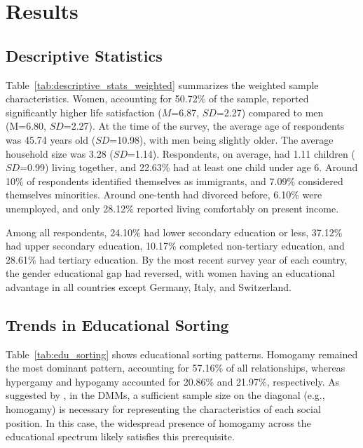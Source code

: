 \section{Results}
\label{sec:ch3-results}

\subsection{Descriptive Statistics}

Table~\ref{tab:descriptive_stats_weighted} summarizes the weighted sample characteristics. Women, accounting for 50.72\% of the sample, reported significantly higher life satisfaction ($M$=6.87, $SD$=2.27) compared to men (M=6.80, $SD$=2.27). At the time of the survey, the average age of respondents was 45.74 years old ($SD$=10.98), with men being slightly older. The average household size was 3.28 ($SD$=1.14). Respondents, on average, had 1.11 children ($SD$=0.99) living together, and 22.63\% had at least one child under age 6. Around 10\% of respondents identified themselves as immigrants, and 7.09\% considered themselves minorities. Around one-tenth had divorced before, 6.10\% were unemployed, and only 28.12\% reported living comfortably on present income.

Among all respondents, 24.10\% had lower secondary education or less, 37.12\% had upper secondary education, 10.17\% completed non-tertiary education, and 28.61\% had tertiary education. By the most recent survey year of each country, the gender educational gap had reversed, with women having an educational advantage in all countries except Germany, Italy, and Switzerland.

\subsection{Trends in Educational Sorting}

Table~\ref{tab:edu_sorting} shows educational sorting patterns. Homogamy remained the most dominant pattern, accounting for 57.16\% of all relationships, whereas hypergamy and hypogamy accounted for 20.86\% and 21.97\%, respectively. As suggested by \textcite{sobelSocialMobilityFertility1985}, in the DMMs, a sufficient sample size on the diagonal (e.g., homogamy) is necessary for representing the characteristics of each social position. In this case, the widespread presence of homogamy across the educational spectrum likely satisfies this prerequisite.

